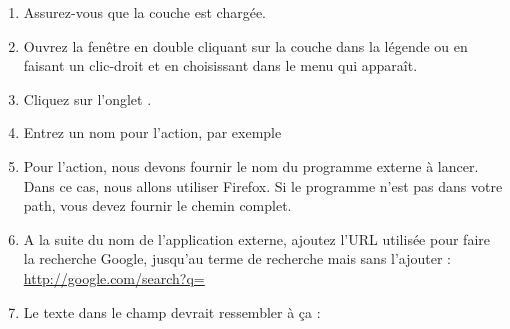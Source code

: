 \begin{enumerate}
\item Assurez-vous que la couche  est chargée.
\item Ouvrez la fenêtre  en double cliquant sur la couche dans la légende ou en faisant un clic-droit et en choisissant  dans le menu qui apparaît.
\item Cliquez sur l'onglet .
\item Entrez un nom pour l'action, par exemple 
\item Pour l'action, nous devons fournir le nom du programme externe à lancer. Dans ce cas, nous allons utiliser Firefox. Si le programme n'est pas dans votre path, vous devez fournir le chemin complet.
\item A la suite du nom de l'application externe, ajoutez l'URL utilisée pour faire la recherche Google, jusqu'au terme de recherche mais sans l'ajouter : \url{http://google.com/search?q=}
\item Le texte dans le champ  devrait ressembler à ça :\\

\end{enumerate}

